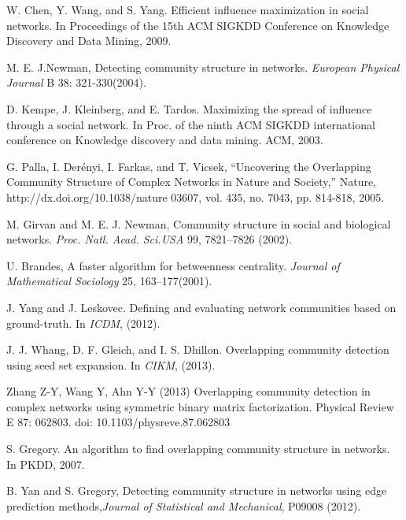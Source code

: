\begin{thebibliography}{1}
		 
		\footnotesize
		
		W. Chen, Y. Wang, and S. Yang. Efficient influence maximization in social networks. 
		In Proceedings of the 15th ACM SIGKDD Conference on Knowledge Discovery and Data Mining, 2009.
		
		M. E. J.Newman, Detecting community structure in networks. \textit{European Physical Journal} B 38: 321-330(2004).
		
		 D. Kempe, J. Kleinberg, and E. Tardos. Maximizing the spread of influence through a social network. In Proc. of the ninth ACM SIGKDD international conference on Knowledge discovery and data mining. ACM, 2003.
		
		G. Palla, I. Derényi, I. Farkas, and T. Vicsek, “Uncovering the Overlapping Community Structure of Complex Networks in
Nature and Society,” Nature, http://dx.doi.org/10.1038/nature 03607, vol. 435, no. 7043, pp. 814-818, 2005.
		
		M. Girvan and M. E. J. Newman, Community structure in social and biological networks. \textit{ Proc. Natl. Acad. Sci.USA} 99, 7821–7826 (2002).		
		
		U. Brandes, A faster algorithm for betweenness centrality. \textit{Journal of Mathematical Sociology} 25, 163–177(2001).
		
		 J. Yang and J. Leskovec. Defining and evaluating network communities based on ground-truth. In \textit{ICDM}, (2012).
		
		  J. J. Whang, D. F. Gleich, and I. S. Dhillon. Overlapping community detection using seed set expansion. In \textit{CIKM}, (2013).   
		  
		 Zhang Z-Y, Wang Y, Ahn Y-Y (2013) Overlapping community detection in complex networks using symmetric binary matrix factorization. Physical Review E 87: 062803. doi: 10.1103/physreve.87.062803 

		S. Gregory. An algorithm to find overlapping community structure in networks. In PKDD, 2007.
		
		 B. Yan and S. Gregory, Detecting community structure in networks using edge prediction methods,\textit{Journal of Statistical and Mechanical}, P09008 (2012).
		 

\end{thebibliography}
